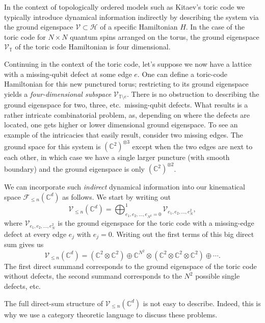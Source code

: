 In the context of topologically ordered models such as Kitaev's toric code we typically introduce dynamical information indirectly by describing the system via the ground eigenspace $\mathcal{V}\subset \mathcal{H}$ of a specific Hamiltonian $H$. In the case of the toric code for $N\times N$ quantum spins arranged on the torus, the ground eigenspace $\mathcal{V}_{\mathbb{T}}$ of the toric code Hamiltonian is four dimensional.

Continuing in the context of the toric code, let's suppose we now have a lattice with a missing-qubit defect at some edge $e$. One can define a toric-code Hamiltonian for this new punctured torus; restricting to its ground eigenspace yields a \emph{four-dimensional subspace} $\mathcal{V}_{\mathbb{T}\setminus e}$. There is no obstruction to describing the ground eigenspace for two, three, etc.\ missing-qubit defects. What results is a rather intricate combinatorial problem, as, depending on where the defects are located, one gets higher or lower dimensional ground eigenspace. To see an example of the intricacies that easily result, consider two missing edges. The ground space for this system is $(\mathbb{C}^2)^{\otimes 3}$ except when the two edges are next to each other, in which case we have a single larger puncture (with smooth boundary) and the ground eigenspace is only $(\mathbb{C}^2)^{\otimes 2}$.

We can incorporate such \emph{indirect} dynamical information into our kinematical space $\mathcal{F}_{\le n}(\mathbb{C}^d)$ as follows. We start by writing out 
\begin{equation}
	\mathcal{V}_{\le n}(\mathbb{C}^d) = \bigoplus_{e_1,e_2, \ldots, e_{N^2} =0}^1 \mathcal{V}_{e_1,e_2,\ldots, e_N^2},
\end{equation}
where $\mathcal{V}_{e_1,e_2,\ldots, e_N^2}$ is the ground eigenspace for the toric code with a missing-edge defect at every edge $e_j$ with $e_j=0$. Writing out the first terms of this big direct sum gives us
\begin{equation}
	\mathcal{V}_{\le n}(\mathbb{C}^d) = (\mathbb{C}^2\otimes \mathbb{C}^2)\oplus \mathbb{C}^{N^2}\otimes (\mathbb{C}^2\otimes \mathbb{C}^2\otimes \mathbb{C}^2)\oplus \cdots.
\end{equation}
The first direct summand corresponds to the ground eigenspace of the toric code without defects, the second summand corresponds to the $N^2$ possible single defects, etc.

The full direct-sum structure of $\mathcal{V}_{\le n}(\mathbb{C}^d)$ is not easy to describe. Indeed, this is why we use a category theoretic language to discuss these problems. 

